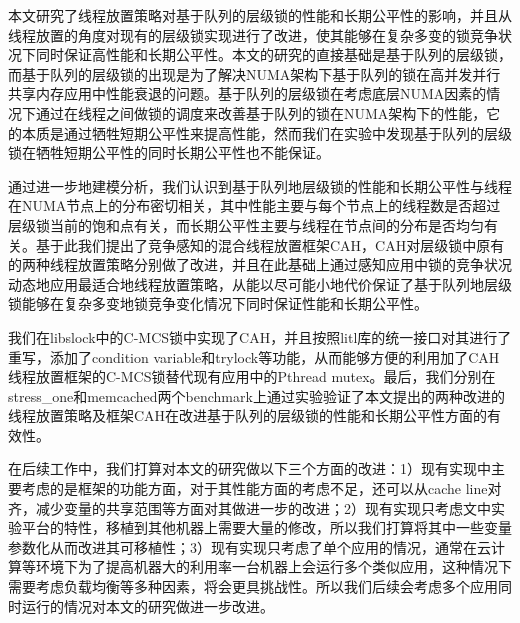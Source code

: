 
\begin{summary}
本文研究了线程放置策略对基于队列的层级锁的性能和长期公平性的影响，并且从线程放置的角度对现有的层级锁实现进行了改进，使其能够在复杂多变的锁竞争状况下同时保证高性能和长期公平性。本文的研究的直接基础是基于队列的层级锁，而基于队列的层级锁的出现是为了解决NUMA架构下基于队列的锁在高并发并行共享内存应用中性能衰退的问题。基于队列的层级锁在考虑底层NUMA因素的情况下通过在线程之间做锁的调度来改善基于队列的锁在NUMA架构下的性能，它的本质是通过牺牲短期公平性来提高性能，然而我们在实验中发现基于队列的层级锁在牺牲短期公平性的同时长期公平性也不能保证。

通过进一步地建模分析，我们认识到基于队列地层级锁的性能和长期公平性与线程在NUMA节点上的分布密切相关，其中性能主要与每个节点上的线程数是否超过层级锁当前的饱和点有关，而长期公平性主要与线程在节点间的分布是否均匀有关。基于此我们提出了竞争感知的混合线程放置框架CAH，CAH对层级锁中原有的两种线程放置策略分别做了改进，并且在此基础上通过感知应用中锁的竞争状况动态地应用最适合地线程放置策略，从能以尽可能小地代价保证了基于队列地层级锁能够在复杂多变地锁竞争变化情况下同时保证性能和长期公平性。

我们在libslock中的C-MCS锁中实现了CAH，并且按照litl库的统一接口对其进行了重写，添加了condition variable和trylock等功能，从而能够方便的利用加了CAH线程放置框架的C-MCS锁替代现有应用中的Pthread mutex。最后，我们分别在stress\_one和memcached两个benchmark上通过实验验证了本文提出的两种改进的线程放置策略及框架CAH在改进基于队列的层级锁的性能和长期公平性方面的有效性。

在后续工作中，我们打算对本文的研究做以下三个方面的改进：1）现有实现中主要考虑的是框架的功能方面，对于其性能方面的考虑不足，还可以从cache line对齐，减少变量的共享范围等方面对其做进一步的改进；2）现有实现只考虑文中实验平台的特性，移植到其他机器上需要大量的修改，所以我们打算将其中一些变量参数化从而改进其可移植性；3）现有实现只考虑了单个应用的情况，通常在云计算等环境下为了提高机器大的利用率一台机器上会运行多个类似应用，这种情况下需要考虑负载均衡等多种因素，将会更具挑战性。所以我们后续会考虑多个应用同时运行的情况对本文的研究做进一步改进。

\end{summary}
